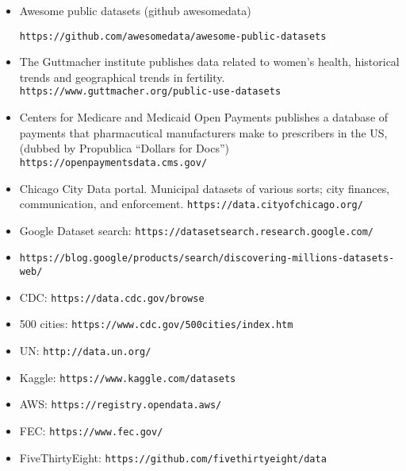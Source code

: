 \documentclass[]{book}
\theoremstyle{definition}
\newtheorem*{soln}{Solution}
\begin{document}
\begin{enumerate}
\begin{itemize}

\item  Awesome public datasets (github awesomedata)

\texttt{https://github.com/awesomedata/awesome-public-datasets}


\item The Guttmacher institute publishes data related to women's health,  historical trends and geographical trends in fertility.
\texttt{https://www.guttmacher.org/public-use-datasets}

\item Centers for Medicare and Medicaid Open Payments publishes a database of payments that pharmacutical manufacturers make to prescribers in the US, (dubbed by Propublica ``Dollars for Docs'')
\texttt{https://openpaymentsdata.cms.gov/}

\item Chicago City Data portal.  Municipal datasets of various sorts; city finances, communication, and enforcement.
\texttt{https://data.cityofchicago.org/}

\item 
Google Dataset search: \texttt{https://datasetsearch.research.google.com/}
\item
\texttt{https://blog.google/products/search/discovering-millions-datasets-web/}
\item
CDC: \texttt{https://data.cdc.gov/browse}
\item
500 cities: \texttt{https://www.cdc.gov/500cities/index.htm}
\item
UN: \texttt{http://data.un.org/}
\item
Kaggle: \texttt{https://www.kaggle.com/datasets}
\item
AWS: \texttt{https://registry.opendata.aws/}
\item
FEC: \texttt{https://www.fec.gov/}
\item
FiveThirtyEight: \texttt{https://github.com/fivethirtyeight/data}

\end{itemize}


\end{enumerate}
\end{document}

